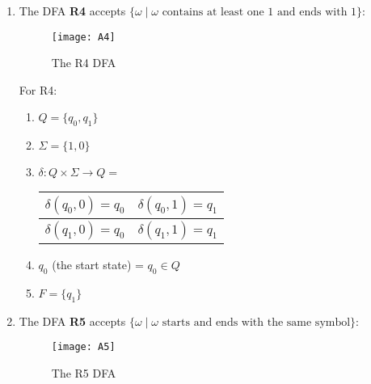\documentclass[11pt,a4paper]{article}
\begin{document}
\begin{enumerate}
            \item The DFA \textbf{R4} accepts $\{\omega\mid\omega\text{ contains at least one 1 and ends with 1}\}$:
                \begin{figure}[H]
                    \centering
                    \texttt{[image: A4]}
                    \caption{The R4 DFA}
                \end{figure}

                For R4:
                \begin{enumerate}
                    \item $Q = \{q_0, q_1\}$
                    \item $\Sigma = \{1, 0\}$
                    \item $\delta \colon Q \times \Sigma \rightarrow Q =$
                    \begin{tabular}{|c|c|} 
                        \hline
                        $\delta(q_0, 0) = q_0$ & $\delta(q_0, 1) = q_1$\\
                        \hline
                        $\delta(q_1, 0) = q_0$ & $\delta(q_1, 1) = q_1$ \\
                        \hline
                   \end{tabular}
                    \item $q_0$ (the start state) = $q_0 \in Q$
                    \item $F = \{q_1\}$
                \end{enumerate}

            \item The DFA \textbf{R5} accepts $\{\omega\mid\omega\text{ starts and ends with the same symbol}\}$:\\
                \begin{figure}[H]
                    \centering
                    \texttt{[image: A5]}
                    \caption{The R5 DFA}
                \end{figure}


\end{enumerate}
\end{document}
